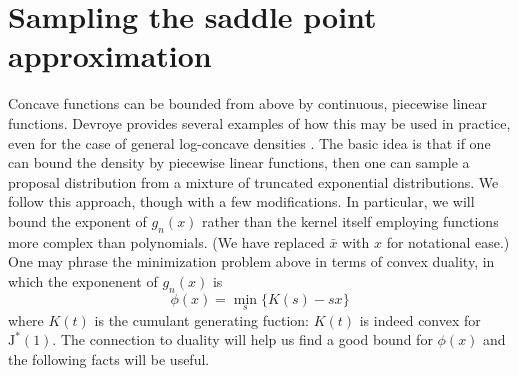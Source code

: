 \documentclass[12pt]{article}
\newcommand{\JJ}{\text{J}^*}
\begin{document}
\section{Sampling the saddle point approximation}
\label{sec:largeb}

Concave functions can be bounded from above by continuous, piecewise linear
functions.  Devroye provides several examples of how this may be used in
practice, even for the case of general log-concave densities
\citep{devroye-1986, devroye-2012}.  The basic idea is that if one can bound the
density by piecewise linear functions, then one can sample a proposal
distribution from a mixture of truncated exponential distributions.  We follow
this approach, though with a few modifications.  In particular, we will bound
the exponent of $g_n(x)$ rather than the kernel itself employing functions more
complex than polynomials.  (We have replaced $\bar x$ with $x$ for notational
ease.)  One may phrase the minimization problem above in terms of convex
duality, in which the exponenent of $g_n(x)$ is
\[
\phi(x) = \min_{s} \Big\{ K(s) - s x \Big\}
\]
where $K(t)$ is the cumulant generating fuction: $K(t)$ is indeed convex for
$\JJ(1)$.  The connection to duality will help us find a good bound for
$\phi(x)$ and the following facts will be useful.
\end{document}
